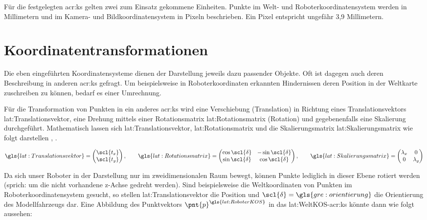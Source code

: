 Für die festgelegten \gls{acr:ks} gelten zwei zum Einsatz gekommene Einheiten. Punkte im Welt- und Roboterkoordinatensystem werden in Millimetern und im Kamera- und Bildkoordinatensystem in Pixeln beschrieben. Ein Pixel entspricht ungefähr 3,9 Millimetern.

\section{Koordinatentransformationen}

Die eben eingeführten Koordinatensysteme dienen der Darstellung jeweils dazu passender Objekte. Oft ist dagegen auch deren Beschreibung in anderen \gls{acr:ks} gefragt. Um beispielsweise in Roboterkoordinaten erkannten Hindernissen deren Position in der Weltkarte zuschreiben zu können, bedarf es einer Umrechnung. 

Für die Transformation von Punkten in ein anderes \gls{acr:ks} wird eine Verschiebung (Translation) in Richtung eines Translationsvektors \gls{lat:Translationsvektor}, eine Drehung mittels einer Rotationsmatrix \gls{lat:Rotationsmatrix} (Rotation) und gegebenenfalls eine Skalierung durchgeführt.
Mathematisch lassen sich \gls{lat:Translationsvektor}, \gls{lat:Rotationsmatrix} und die Skalierungsmatrix \gls{lat:Skalierungsmatrix} wie folgt darstellen \autocite[S.~26f]{corkeRoboticsVisionControl2017}, \autocite[S.~133]{nischwitzComputergrafik2011}.

\begin{equation}
\gls{lat:Translationsvektor} = 
\begin{pmatrix}
\scl{t_x} 	\\
\scl{t_y} 	\\
\end{pmatrix}
, \qquad
\gls{lat:Rotationsmatrix} = 
\begin{pmatrix}
\cos{\scl{\delta}} & -\sin{\scl{\delta}} 	\\
\sin{\scl{\delta}} & \cos{\scl{\delta}} 	\\
\end{pmatrix}
, \qquad
\gls{lat:Skalierungsmatrix} =
\begin{pmatrix}
\lambda_x 	& 0 		\\
0 			& \lambda_y 	\\
\end{pmatrix}
\end{equation} 

Da sich unser Roboter in der Darstellung nur im zweidimensionalen Raum bewegt, können Punkte lediglich in dieser Ebene rotiert werden (sprich: um die nicht vorhandene \gls{z}-Achse gedreht werden). 
Sind beispielsweise die Weltkoordinaten von Punkten im Roboterkoordinatensystem gesucht, so stellen \gls{lat:Translationsvektor} die Position und \( \scl{\delta} = \gls{gre:orientierung} \) die Orientierung des Modellfahrzeugs dar.
Eine Abbildung des Punktvektors \( \pnt{p}^{\gls{lat:RoboterKOS}} \) in das \gls{lat:WeltKOS}-\gls{acr:ks} könnte dann wie folgt aussehen:


